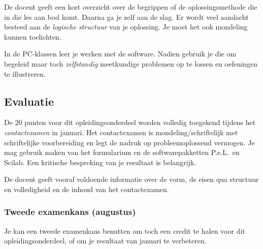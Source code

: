 De docent geeft een kort overzicht over de begrippen of de oplossingsmethode die in die les aan bod komt. Daarna ga je zelf aan de slag. Er wordt veel aandacht besteed aan de \emph{logische structuur} van je oplossing. Je moet het ook mondeling kunnen toelichten. 

In de PC-klassen leer je werken met de software. Nadien gebruik je die om begeleid maar toch \emph{zelfstandig} meetkundige problemen op te lossen en oefeningen te illustreren.

\subsection*{Evaluatie}

De 20 punten voor dit opleidingsonderdeel worden volledig toegekend tijdens het  \emph{contactexamen} in januari. 
Het contactexamen is mondeling/schriftelijk met schriftelijke voorbereiding en legt de nadruk op probleemoplossend vermogen. Je mag gebruik maken van het formularium  en de softwarepakketten P.e.L.\ en Scilab.  Een kritische bespreking van je resultaat is belangrijk.
 
De docent geeft vooraf voldoende informatie over de vorm, de eisen qua structuur en volledigheid en de inhoud van het contactexamen.

\subsubsection*{Tweede examenkans (augustus)}
Je kan een tweede examenkans benutten om toch een credit te halen voor dit opleidingsonderdeel, of om je resultaat van januari te verbeteren.

